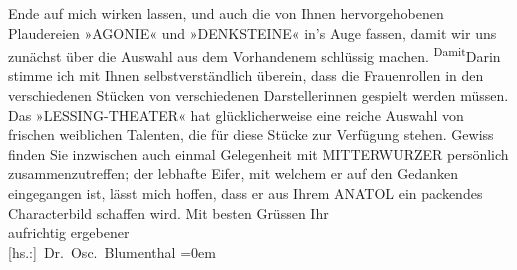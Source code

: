 \begin{ledgroupsized}[t]{13cm}
                    Ende auf mich wirken lassen, und auch die von Ihnen hervorgehobenen Plaudereien
                        »AGONIE« und »DENKSTEINE« in’s Auge
                    fassen, damit wir uns zunächst über die Auswahl aus dem Vorhandenem schlüssig
                    machen. \substVorne{}\textsuperscript{Damit}\substDazwischen{}Darin\substHinten{} stimme ich mit Ihnen selbstverständlich überein, dass die Frauenrollen
                    in den verschiedenen Stücken von verschiedenen Darstellerinnen gespielt werden
                    müssen. Das »LESSING-THEATER« hat glücklicherweise eine reiche Auswahl {\pb}von frischen weiblichen Talenten,
                    die für diese Stücke zur Verfügung stehen. Gewiss finden Sie inzwischen auch
                    einmal Gelegenheit mit MITTERWURZER persönlich zusammenzutreffen; der lebhafte
                    Eifer, mit welchem er auf den Gedanken eingegangen ist, lässt mich hoffen, dass
                    er aus Ihrem ANATOL
                    ein packendes Characterbild schaffen wird.\pend
           \pstart
           Mit besten Grüssen Ihr{\\[\baselineskip]} aufrichtig ergebener{\\[\baselineskip]}\spacefill\mbox{{[}hs.:{]} Dr. Osc. Blumenthal}\pend
           \leftskip=0em{}\endnumbering{}\end{ledgroupsized}  \newcommand{\dateiname}{L00623}\newcommand{\titel}{Oscar Blumenthal an Arthur Schnitzler, 19. 11. 1896}\newcommand{\editorInnen}{Martin Anton Müller und Gerd-Hermann Susen}
      